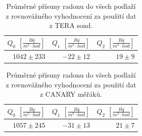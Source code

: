 \begin{table}[H]
    \centering
    \caption{Průměrné přísuny radonu do všech podlaží z rovnovážného vyhodnocení za použití dat z TERA sond.}
    \label{tab:anglicka574_prisunyRovnovazne}
    \begin{tabular}{rrr}
        \toprule
        $Q_0$ $\left[\si{\frac{Bq}{m^3\cdot hod}}\right]$& $Q_1$ $\left[\si{\frac{Bq}{m^3\cdot hod}}\right]$ & $Q_2$ $\left[\si{\frac{Bq}{m^3\cdot hod}}\right]$\\
        \midrule
        $1042\pm233$ & $-22\pm12$ & $19\pm9$\\
        \bottomrule
    \end{tabular}
\end{table}
\begin{table}[H]
    \centering
    \caption{Průměrné přísuny radonu do všech podlaží z rovnovážného vyhodnocení za použití dat z CANARY měřáků.}
    \label{tab:anglicka574_prisunyRovnovazneCANARY}
    \begin{tabular}{rrr}
        \toprule
        $Q_0$ $\left[\si{\frac{Bq}{m^3\cdot hod}}\right]$& $Q_1$ $\left[\si{\frac{Bq}{m^3\cdot hod}}\right]$ & $Q_2$ $\left[\si{\frac{Bq}{m^3\cdot hod}}\right]$\\
        \midrule
        $1057\pm245$ & $-31\pm13$ & $21\pm7$\\
        \bottomrule
    \end{tabular}
\end{table}

